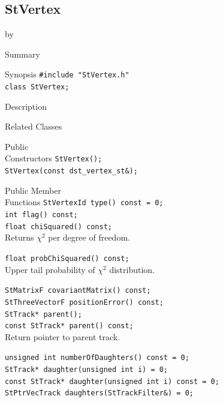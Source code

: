 \documentclass[twoside]{article}
\newcommand{\entrylabel}[1]{\mbox{\textbf{{#1}}}\hfil}%
\newenvironment{entry}
{\begin{list}{}%
    {\renewcommand{\makelabel}{\entrylabel}%
     \setlength{\labelwidth}{90pt}%
     \setlength{\leftmargin}{\labelwidth}
     \advance\leftmargin by \labelsep%
      }%
    }%
  {\end{list}}
\newcommand{\Entrylabel}[1]%
{\raisebox{0pt}[1ex][0pt]{\makebox[\labelwidth][l]%
    {\parbox[t]{\labelwidth}{\hspace{0pt}\textbf{{#1}}}}}}
\newenvironment{Entry}%
{\renewcommand{\entrylabel}{\Entrylabel}\begin{entry}}%
  {\end{entry}}
\begin{document}
\subsection{StVertex}
\label{sec:StVertex}
\begin{Entry}
\item[Summary]
\item[Synopsis]
    \verb+#include "StVertex.h"+\\
    \verb+class StVertex;+\\
\item[Description]
\item[Related Classes]
\item[Public\\ Constructors]
    \verb+StVertex();+\\
    \verb+StVertex(const dst_vertex_st&);+\\
\item[Public Member\\ Functions]
    \verb+StVertexId type() const = 0;+\\

    \verb+int flag() const;+\\

    \verb+float chiSquared() const;+\\
    Returns $\chi^2$ per degree of freedom. 

    \verb+float probChiSquared() const;+\\
    Upper tail probability of $\chi^2$ distribution.

    \verb+StMatrixF covariantMatrix() const;+\\

    \verb+StThreeVectorF positionError() const;+\\
    
    \verb+StTrack* parent();+\\
    \verb+const StTrack* parent() const;+\\
    Return pointer to parent track.
    
    \verb+unsigned int numberOfDaughters() const = 0;+\\

    \verb+StTrack* daughter(unsigned int i) = 0;+\\
    \verb+const StTrack* daughter(unsigned int i) const = 0;+\\

    \verb+StPtrVecTrack daughters(StTrackFilter&) = 0;+\\


\end{Entry}
\end{document}
